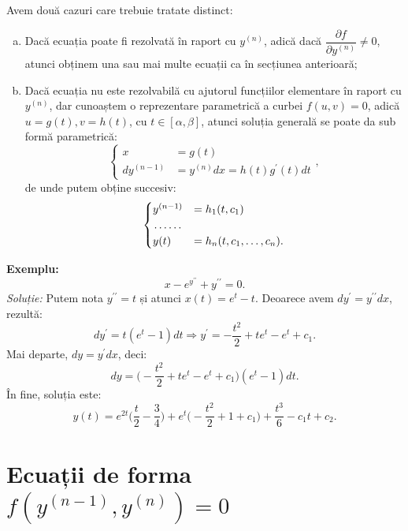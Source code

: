 Avem două cazuri care trebuie tratate distinct:
\begin{enumerate}[(a)]
\item Dacă ecuația poate fi rezolvată în raport cu $ y^{(n)} $, adică dacă
  $ \dfrac{\partial f}{\partial y^{(n)}} \neq 0 $, atunci obținem una
  sau mai multe ecuații ca în secțiunea anterioară;
\item Dacă ecuația nu este rezolvabilă cu ajutorul funcțiilor elementare
  în raport cu $ y^{(n)} $, dar cunoaștem o reprezentare parametrică
  a curbei $ f(u, v) = 0 $, adică $ u = g(t), v = h(t) $, cu
  $ t \in [\alpha, \beta] $, atunci soluția generală se poate da sub formă
  parametrică:
  \[
    \begin{cases}
      x &= g(t) \\
      dy^{(n-1)} &= y^{(n)} dx = h(t) g^{\prime}(t) dt
    \end{cases},
  \]
  de unde putem obține succesiv:
  \[
    \begin{cases}
      y^{(n-1)}  &= h_1(t, c_1) \\
      \dotfill \\
      y(t) &= h_n(t, c_1, \dots, c_n).
    \end{cases}
  \]
\end{enumerate}

\textbf{Exemplu:}
\[
  x - e^{y^{\prime\prime}} + y^{\prime\prime} = 0.
\]
\emph{Soluție:} Putem nota $ y^{\prime\prime} = t $ și atunci $ x(t) = e^t - t $.
Deoarece avem $ dy^{\prime} = y^{\prime\prime} dx $, rezultă:
\[
  dy^{\prime} = t(e^t - 1) dt \Rightarrow y^{\prime} = -\dfrac{t^2}{2} + te^t - e^t + c_1.
\]
Mai departe, $ dy = y^{\prime} dx $, deci:
\[
  dy = \Big( - \dfrac{t^2}{2} + te^t - e^t + c_1 \Big)(e^t - 1) dt.
\]
În fine, soluția este:
\[
  y(t) = e^{2t} \Big( \dfrac{t}{2} - \dfrac{3}{4} \Big) + e^t \Big( - \dfrac{t^2}{2} + %
  1 + c_1 \Big) + \dfrac{t^3}{6} - c_1 t + c_2.
\]


\section{Ecuații de forma $ f(y^{(n-1)}, y^{(n)}) = 0 $}

